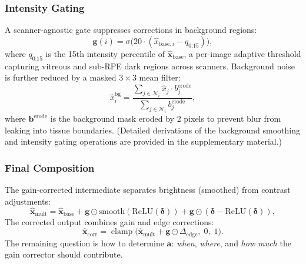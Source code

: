 \documentclass{ieeetj}
\begin{document}
\subsubsection{Intensity Gating}
A scanner-agnostic gate suppresses corrections in background regions:
\begin{equation}
\mathbf{g}(i) = \sigma\!\big(20 \cdot (\hat{x}_{\text{base},i} - q_{0.15})\big),
\label{eq:intensity_gate}
\end{equation}
where $q_{0.15}$ is the 15th intensity percentile of $\hat{\mathbf{x}}_{\text{base}}$, a per-image adaptive threshold capturing vitreous and sub-RPE dark regions across scanners. Background noise is further reduced by a masked $3{\times}3$ mean filter:
\begin{equation}
\hat{x}_i^\text{bg} = \frac{\sum_{j \in \mathcal{N}_i} \hat{x}_j \cdot b_j^\text{erode}}{\sum_{j \in \mathcal{N}_i} b_j^\text{erode}},
\label{eq:bg_smooth}
\end{equation}
where $\mathbf{b}^\text{erode}$ is the background mask eroded by 2 pixels to prevent blur from leaking into tissue boundaries. (Detailed derivations of the background smoothing and intensity gating operations are provided in the supplementary material.)

\subsubsection{Final Composition}
The gain-corrected intermediate separates brightness (smoothed) from contrast adjustments:
\begin{equation}
\hat{\mathbf{x}}_\text{mult} = \hat{\mathbf{x}}_\text{base} + \mathbf{g} \odot \text{smooth}(\text{ReLU}(\boldsymbol{\delta})) + \mathbf{g} \odot (\boldsymbol{\delta} - \text{ReLU}(\boldsymbol{\delta})),
\label{eq:xmult}
\end{equation}
The corrected output combines gain and edge corrections:
\begin{equation}
\hat{\mathbf{x}}_\text{corr} = \operatorname{clamp}\!\big(\hat{\mathbf{x}}_\text{mult} + \mathbf{g} \odot \Delta_\text{edge},\; 0,\; 1\big).
\label{eq:final}
\end{equation}
The remaining question is how to determine $\mathbf{a}$: \emph{when}, \emph{where}, and \emph{how much} the gain corrector should contribute.

\end{document}
